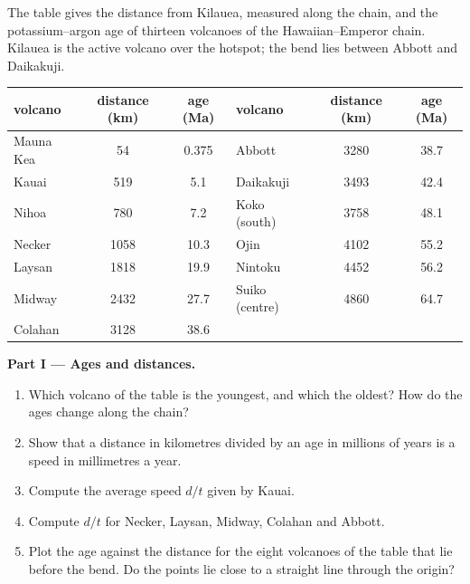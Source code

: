\begin{problem}
\label{pb:g11:plate-motions:1}
The table gives the distance from Kilauea, measured along the chain, and the
potassium--argon age of thirteen volcanoes of the Hawaiian--Emperor chain.
Kilauea is the active volcano over the hotspot; the bend lies between Abbott
and Daikakuji.

\begin{center}
\small
\begin{tabular}{|l|c|c||l|c|c|}
\hline
volcano & distance (\unit{km}) & age (\unit{Ma}) & volcano & distance (\unit{km}) & age (\unit{Ma}) \\ \hline
Mauna Kea & 54 & 0.375 & Abbott & 3280 & 38.7 \\ \hline
Kauai & 519 & 5.1 & Daikakuji & 3493 & 42.4 \\ \hline
Nihoa & 780 & 7.2 & Koko (south) & 3758 & 48.1 \\ \hline
Necker & 1058 & 10.3 & Ojin & 4102 & 55.2 \\ \hline
Laysan & 1818 & 19.9 & Nintoku & 4452 & 56.2 \\ \hline
Midway & 2432 & 27.7 & Suiko (centre) & 4860 & 64.7 \\ \hline
Colahan & 3128 & 38.6 & & & \\ \hline
\end{tabular}
\end{center}

\medskip
\noindent\textbf{Part I --- Ages and distances.}
\begin{enumerate}
  \item Which volcano of the table is the youngest, and which the oldest? How
        do the ages change along the chain?
  \item Show that a distance in kilometres divided by an age in millions of
        years is a speed in millimetres a year.
  \item Compute the average speed $d/t$ given by Kauai.
  \item Compute $d/t$ for Necker, Laysan, Midway, Colahan and Abbott.
  \item Plot the age against the distance for the eight volcanoes of the
        table that lie before the bend. Do the points lie close to a straight line through
        the origin?
\end{enumerate}


\end{problem}
